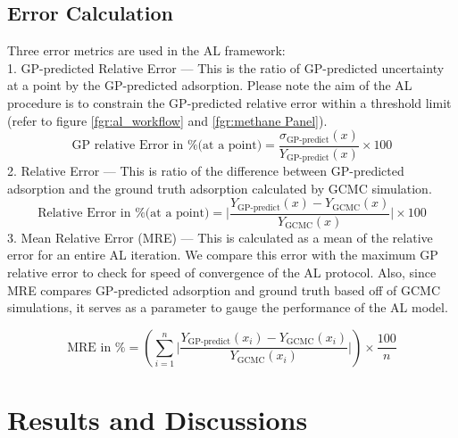 \documentclass[twoside,twocolumn,9pt]{article}
\begin{document}
\subsection{Error Calculation}

Three error metrics are used in the AL framework:\\
1. GP-predicted Relative Error --- This is the ratio of GP-predicted uncertainty at a point by the GP-predicted adsorption. Please note the aim of the AL procedure is to constrain the GP-predicted relative error within a threshold limit (refer to figure \ref{fgr:al_workflow} and \ref{fgr:methane Panel}).
\begin{equation}
    \text{GP relative Error in \% (at a point)} = \frac{{\sigma}_{\text{GP-predict}}(x)}{Y_{\text{GP-predict}}(x)} \times 100 
\end{equation}
2. Relative Error --- This is ratio of the difference between GP-predicted adsorption and the ground truth adsorption calculated by GCMC simulation.
\begin{equation}
    \text{Relative Error in \% (at a point)} = \Bigg|\frac{Y_{\text{GP-predict}}(x) - Y_{\text{GCMC}}(x)}{Y_{\text{GCMC}}(x)}\Bigg| \times 100 
\end{equation}
3. Mean Relative Error (MRE) --- This is calculated as a mean of the relative error for an entire AL iteration. We compare this error with the maximum GP relative error to check for speed of convergence of the AL protocol. Also, since MRE compares GP-predicted adsorption and ground truth based off of GCMC simulations, it serves as a parameter to gauge the performance of the AL model.

\begin{equation}
    \text{MRE in \%} = \left(\sum_{i=1}^{n} \Bigg|{\frac{Y_{\text{GP-predict}}(x_i) - Y_{\text{GCMC}}(x_i)}{Y_{\text{GCMC}}(x_i)}}\Bigg|\right) \times \frac{100}{n}
\end{equation}

\section{Results and Discussions}
\end{document}
